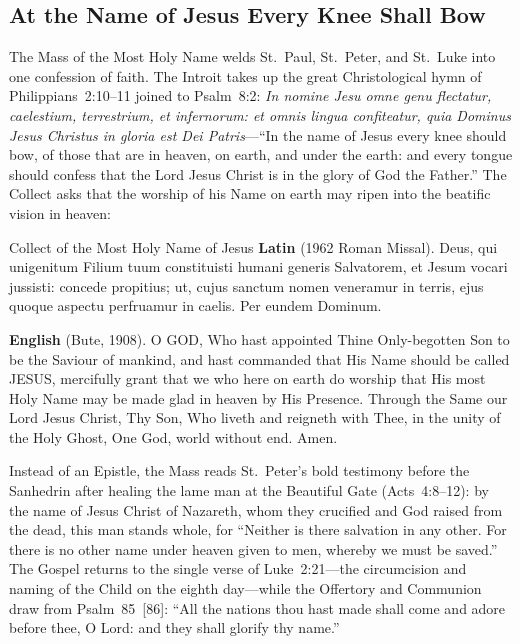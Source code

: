 \subsection{At the Name of Jesus Every Knee Shall Bow}

The Mass of the Most Holy Name welds St.~Paul, St.~Peter, and St.~Luke into one
confession of faith. The Introit takes up the great Christological hymn of
Philippians~2:10--11 joined to Psalm~8:2: \textit{In nomine Jesu omne genu
flectatur, caelestium, terrestrium, et infernorum: et omnis lingua confiteatur,
quia Dominus Jesus Christus in gloria est Dei Patris}---``In the name of Jesus
every knee should bow, of those that are in heaven, on earth, and under the
earth: and every tongue should confess that the Lord Jesus Christ is in the
glory of God the Father.'' The Collect asks that the worship of his Name on
earth may ripen into the beatific vision in heaven:

\begin{massbox}{Collect of the Most Holy Name of Jesus}
\textbf{Latin} (1962 Roman Missal). Deus, qui unigenitum Filium tuum
constituisti humani generis Salvatorem, et Jesum vocari jussisti: concede
propitius; ut, cujus sanctum nomen veneramur in terris, ejus quoque aspectu
perfruamur in caelis. Per eundem Dominum.

\textbf{English} (Bute, 1908). O GOD, Who hast appointed Thine Only-begotten
Son to be the Saviour of mankind, and hast commanded that His Name should be
called JESUS, mercifully grant that we who here on earth do worship that His
most Holy Name may be made glad in heaven by His Presence. Through the Same our
Lord Jesus Christ, Thy Son, Who liveth and reigneth with Thee, in the unity of
the Holy Ghost, One God, world without end. Amen.
\end{massbox}

Instead of an Epistle, the Mass reads St.~Peter's bold testimony before the
Sanhedrin after healing the lame man at the Beautiful Gate (Acts~4:8--12): by
the name of Jesus Christ of Nazareth, whom they crucified and God raised from
the dead, this man stands whole, for ``Neither is there salvation in any other.
For there is no other name under heaven given to men, whereby we must be
saved.'' The Gospel returns to the single verse of Luke~2:21---the circumcision
and naming of the Child on the eighth day---while the Offertory and Communion
draw from Psalm~85~[86]: ``All the nations thou hast made shall come and adore
before thee, O Lord: and they shall glorify thy name.''

